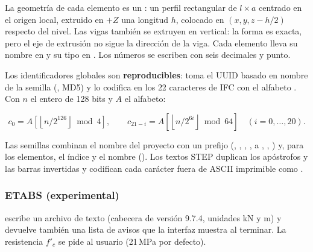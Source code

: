 La geometría de cada elemento es un : un perfil rectangular de $l \times a$ centrado en el
origen local, extruido en $+Z$ una longitud $h$, colocado en $(x, y, z - h/2)$ respecto del nivel. Las vigas también
se extruyen en vertical: la forma es exacta, pero el eje de extrusión no sigue la dirección de la viga. Cada elemento
lleva su nombre en  y su tipo en . Los números se escriben con seis decimales y punto.

Los identificadores globales son \textbf{reproducibles}:  toma el UUID basado en
nombre de la semilla (, MD5) y lo codifica en los 22 caracteres de IFC con el alfabeto
. Con $n$ el entero de 128 bits y $A$ el alfabeto:

\begin{equation}
	c_0 = A\!\left[\left\lfloor n / 2^{126} \right\rfloor \bmod 4\right], \qquad
	c_{21-i} = A\!\left[\left\lfloor n / 2^{6i} \right\rfloor \bmod 64\right] \quad (i = 0, \dots, 20).
\end{equation}

Las semillas combinan el nombre del proyecto con un prefijo (, , ,
,  a , , ) y, para los elementos, el índice y el nombre
(). Los textos STEP duplican los apóstrofos y las barras
invertidas y codifican cada carácter fuera de ASCII imprimible como
.

\subsubsection{ETABS (experimental)}

 escribe un archivo de texto 
(cabecera de versión 9.7.4, unidades kN y m) y devuelve también una lista de avisos que la interfaz muestra al
terminar. La resistencia $f'_c$ se pide al usuario (21\,MPa por defecto).


